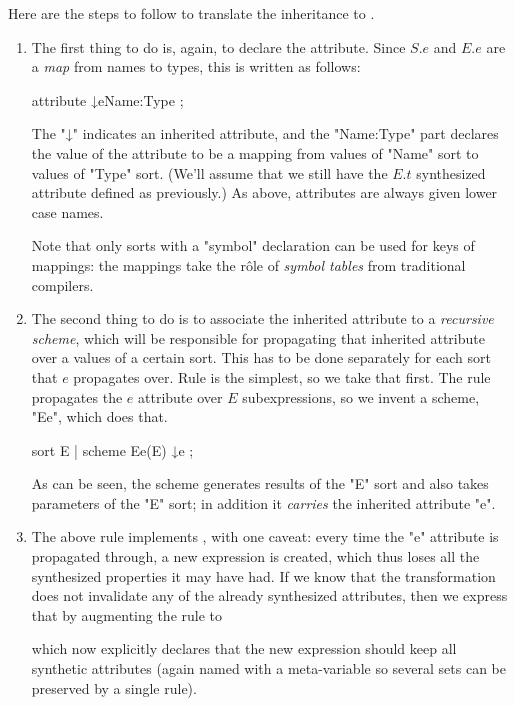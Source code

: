 \documentclass[11pt]{article} %
\begin{document}
Here are the steps to follow to translate the inheritance to \HAX.
\begin{enumerate}

\item The first thing to do is, again, to declare the attribute.  Since $S.e$ and $E.e$ are a
  \emph{map} from names to types, this is written as follows:
\begin{hacs}
   attribute ↓e{Name:Type} ;
\end{hacs}
  The "↓" indicates an inherited attribute, and the "{Name:Type}" part declares the value of the
  attribute to be a mapping from values of "Name" sort to values of "Type" sort. (We'll assume that
  we still have the $E.t$ synthesized attribute defined as previously.)  As above, attributes are
  always given lower case names.

  Note that only sorts with a "symbol" declaration can be used for keys of mappings: the mappings
  take the rôle of \emph{symbol tables} from traditional compilers.

\item The second thing to do is to associate the inherited attribute to a \emph{recursive scheme},
  which will be responsible for propagating that inherited attribute over a values of a certain
  sort.  This has to be done separately for each sort that $e$ propagates over.  Rule  is
  the simplest, so we take that first.  The rule propagates the $e$ attribute over $E$
  subexpressions, so we invent a scheme, "Ee", which does that.
\begin{hacs}
   sort E | scheme Ee(E) ↓e ;
\end{hacs}
  As can be seen, the scheme generates results of the "E" sort and also takes parameters of the "E"
  sort; in addition it \emph{carries} the inherited attribute "e".

\item The above rule implements , with one caveat: every time the "e" attribute is
  propagated through, a new expression is created, which thus loses all the synthesized properties
  it may have had. If we know that the transformation does not invalidate any of the already
  synthesized attributes, then we express that by augmenting the rule to
  which now explicitly declares that the new expression should keep all synthetic attributes (again
  named with a meta-variable so several sets can be preserved by a single rule).


\end{enumerate}
\end{document}
